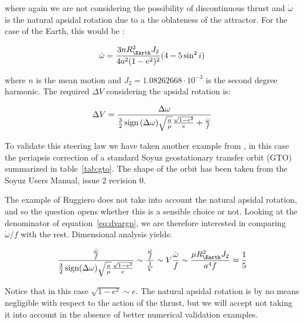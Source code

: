 where again we are not considering the possibility of discontinuous thrust and $\dot{\omega}$ is the natural apsidal rotation due to a the oblateness of the attractor. For the case of the Earth, this would be \cite{vallado2001fundamentals}:

\[
\dot{\omega} = \frac{3 n R_{\Earth}^2 J_2}{4 a^2 (1 - e^2)^2} (4 - 5 \sin^2 i)
\]

where $n$ is the mean motion and $J_2 = 1.08262668 \cdot 10^{-3}$ is the second degree harmonic. The required $\Delta V$ considering the apsidal rotation is:

\begin{equation}
\Delta V = \frac{\Delta \omega}{\frac{3}{2} \operatorname{sign}{(\Delta \omega)} \sqrt{\frac{a}{\mu}} \frac{\sqrt{1 - e^2}}{e} + \frac{\dot{\omega}}{f}}
\label{eq:dvargp}
\end{equation}

To validate this steering law we have taken another example from \cite{ruggiero2011low}, in this case the periapsis correction of a standard Soyuz geostationary transfer orbit (GTO) summarized in table~\ref{tab:gto}. The shape of the orbit has been taken from the Soyuz Users Manual, issue 2 revision 0.

The example of Ruggiero does not take into account the natural apsidal rotation, and so the question opens whether this is a sensible choice or not. Looking at the denominator of equation~\ref{eq:dvargp}, we are therefore interested in comparing $\dot{\omega} / f$ with the rest. Dimensional analysis yields:

\[
\frac{\frac{\dot{\omega}}{f}}{\frac{3}{2} \sign (\Delta \omega) \sqrt{\frac{a}{\mu}} \frac{\sqrt{1 - e^2}}{e}} \sim %
\frac{\frac{\dot{\omega}}{f}}{\frac{1}{V}} \sim %
V \frac{\dot{\omega}}{f} \sim %
\frac{\mu R_{\Earth}^2 J_2}{a^4 f} \approx \frac{1}{5}
\]

Notice that in this case $\sqrt{1 - e^2} \sim e$. The natural apsidal rotation is by no means negligible with respect to the action of the thrust, but we will accept not taking it into account in the absence of better numerical validation examples.

